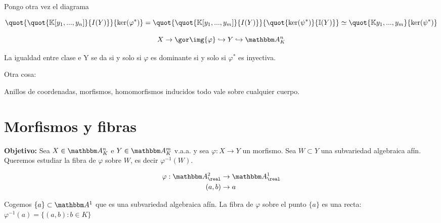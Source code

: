Pongo otra vez el diagrama


$$ \quot{\quot{\K[y_1,...,y_n]}{I(Y)}}{\ker(\varphi^*)}=\quot{\quot{\K[y_1,...,y_m]}{I(Y)}}{\quot{\ker(\psi^*)}{\I(Y)}} \simeq \quot{\K{y_1,...,y_m}}{\ker(\psi^*)} $$

$$ X \rightarrow \cls{\img{\varphi}} \hookrightarrow Y \hookrightarrow \Akn $$

La igualdad entre clase e Y se da si y solo si $\varphi$ es dominante si y solo si $\varphi^*$ es inyectiva.

Otra cosa:

Anillos de coordenadas, morfismos, homomorfismos inducidos todo vale sobre cualquier cuerpo. 


\section{Morfismos y fibras}

\textbf{Objetivo:} Sea $X \in \Akn$ e $Y \in \A^m_K$ v.a.a. y sea $\varphi: X \rightarrow Y$ un morfismo. Sea $W \subset Y$ una subvariedad algebraica afín. Queremos estudiar la fibra de $\varphi$ sobre $W$, es decir $\varphi^{-1}(W)$.

\begin{example}
	\begin{align*}
	\varphi: \A^2_{\real} & \rightarrow \A^1_{\real} \\
	(a,b) & \rightarrow a
	\end{align*}
	
	Cogemos $\{a\} \subset \A^1$ que es una subvariedad algebraica afín. La fibra de $\varphi$ sobre el punto $\{a\}$ es una recta: $\varphi^{-1}(a)=\{ (a,b):b \in K \}$
\end{example}


